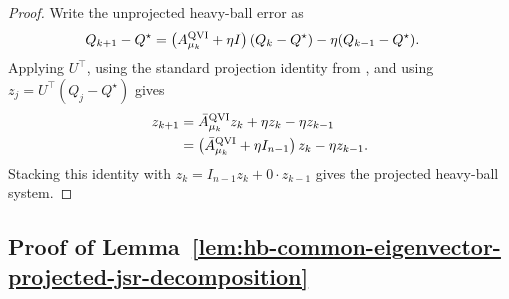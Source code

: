 \documentclass[letterpaper]{article}
\numberwithin{equation}{section}
\begin{document}
\begin{proof}
Write the unprojected heavy-ball error as
\begin{align*}
  Q_{k+1}-Q^\star
  &=\left(A_{\mu_k}^{\rm QVI}+\eta I\right)(Q_k-Q^\star)
    -\eta(Q_{k-1}-Q^\star).
\end{align*}
Applying $U^\top$, using the standard projection identity from
, and using $z_j=U^\top(Q_j-Q^\star)$ gives
\begin{align*}
  z_{k+1}
  &=\bar A_{\mu_k}^{\rm QVI}z_k+\eta z_k-\eta z_{k-1}\\
  &=\left(\bar A_{\mu_k}^{\rm QVI}+\eta I_{n-1}\right)z_k
    -\eta z_{k-1}.
\end{align*}
Stacking this identity with $z_k=I_{n-1}z_k+0\cdot z_{k-1}$ gives the
projected heavy-ball system.
\end{proof}

\subsection{Proof of Lemma~\ref{lem:hb-common-eigenvector-projected-jsr-decomposition}}
\label{app:proof-lem-hb-common-eigenvector-projected-jsr-decomposition}
\end{document}
